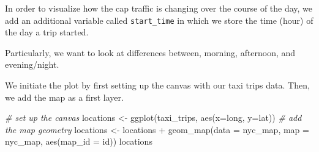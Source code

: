\documentclass[
  12pt,
]{style/krantz}
\newenvironment{Shaded}{\begin{snugshade}}{\end{snugshade}}
\newcommand{\AttributeTok}[1]{\textcolor[rgb]{0.77,0.63,0.00}{#1}}
\newcommand{\CommentTok}[1]{\textcolor[rgb]{0.56,0.35,0.01}{\textit{#1}}}
\newcommand{\DecValTok}[1]{\textcolor[rgb]{0.00,0.00,0.81}{#1}}
\newcommand{\FunctionTok}[1]{\textcolor[rgb]{0.00,0.00,0.00}{#1}}
\newcommand{\NormalTok}[1]{#1}
\newcommand{\OtherTok}[1]{\textcolor[rgb]{0.56,0.35,0.01}{#1}}
\newcommand{\SpecialCharTok}[1]{\textcolor[rgb]{0.00,0.00,0.00}{#1}}
\newcommand{\StringTok}[1]{\textcolor[rgb]{0.31,0.60,0.02}{#1}}
\begin{document}
In order to visualize how the cap traffic is changing over the course of the day, we add an additional variable called \texttt{start\_time} in which we store the time (hour) of the day a trip started.

\begin{Shaded}
\end{Shaded}

Particularly, we want to look at differences between, morning, afternoon, and evening/night.

\begin{Shaded}
\end{Shaded}

We initiate the plot by first setting up the canvas with our taxi trips data. Then, we add the map as a first layer.

\begin{Shaded}
\begin{Highlighting}[]
\CommentTok{\# set up the canvas}
\NormalTok{locations }\OtherTok{\textless{}{-}} \FunctionTok{ggplot}\NormalTok{(taxi\_trips, }\FunctionTok{aes}\NormalTok{(}\AttributeTok{x=}\NormalTok{long, }\AttributeTok{y=}\NormalTok{lat))}
\CommentTok{\# add the map geometry}
\NormalTok{locations }\OtherTok{\textless{}{-}}\NormalTok{ locations }\SpecialCharTok{+} \FunctionTok{geom\_map}\NormalTok{(}\AttributeTok{data =}\NormalTok{ nyc\_map,}
                                  \AttributeTok{map =}\NormalTok{ nyc\_map,}
                                  \FunctionTok{aes}\NormalTok{(}\AttributeTok{map\_id =}\NormalTok{ id))}
\NormalTok{locations}
\end{Highlighting}
\end{Shaded}
\end{document}
